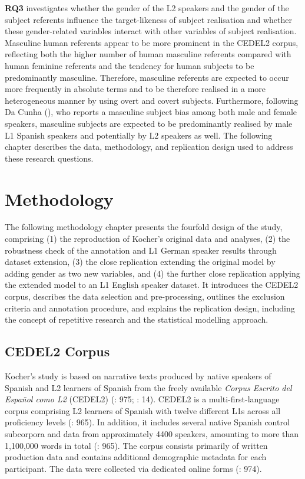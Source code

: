 \documentclass[
  letterpaper,
  DIV=11,
  numbers=noendperiod]{scrartcl}
\begin{document}
\textbf{RQ3} investigates whether the gender of the L2 speakers and the
gender of the subject referents influence the target-likeness of subject
realisation and whether these gender-related variables interact with
other variables of subject realisation. Masculine human referents appear
to be more prominent in the CEDEL2 corpus, reflecting both the higher
number of human masculine referents compared with human feminine
referents and the tendency for human subjects to be predominantly
masculine. Therefore, masculine referents are expected to occur more
frequently in absolute terms and to be therefore realised in a more
heterogeneous manner by using overt and covert subjects. Furthermore,
following Da Cunha (), who reports a
masculine subject bias among both male and female speakers, masculine
subjects are expected to be predominantly realised by male L1 Spanish
speakers and potentially by L2 speakers as well. The following chapter
describes the data, methodology, and replication design used to address
these research questions.

\section{Methodology}\label{sec-Methodology}

The following methodology chapter presents the fourfold design of the
study, comprising (1) the reproduction of Kocher's original data and
analyses, (2) the robustness check of the annotation and L1 German
speaker results through dataset extension, (3) the close replication
extending the original model by adding gender as two new variables, and
(4) the further close replication applying the extended model to an L1
English speaker dataset. It introduces the CEDEL2 corpus, describes the
data selection and pre-processing, outlines the exclusion criteria and
annotation procedure, and explains the replication design, including the
concept of repetitive research and the statistical modelling approach.

\subsection{CEDEL2 Corpus}\label{sec-Corpus}

Kocher's study is based on narrative texts produced by native speakers
of Spanish and L2 learners of Spanish from the freely available
\emph{Corpus Escrito del Español como L2} (CEDEL2)
(: 975;
: 14). CEDEL2 is a
multi-first-language corpus comprising L2 learners of Spanish with
twelve different L1s across all proficiency levels
(: 965). In addition, it
includes several native Spanish control subcorpora and data from
approximately 4400 speakers, amounting to more than 1,100,000 words in
total (: 965). The corpus
consists primarily of written production data and contains additional
demographic metadata for each participant. The data were collected via
dedicated online forms (:
974).
\end{document}
